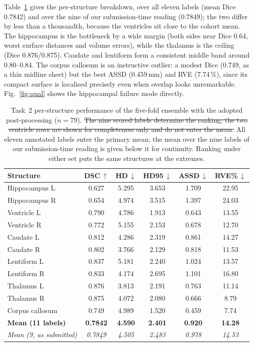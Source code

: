 \documentclass[runningheads]{llncs}
\newcommand{\addone}[1]{\textcolor{revone}{#1}}
\newcommand{\delone}[1]{\textcolor{revone}{\sout{#1}}}
\newcommand{\rowsone}{\color{revone}}
\begin{document}
Table~\ref{tab:perstruct} gives the per-structure breakdown\addone{, over
all eleven labels (mean Dice 0.7842) and over the nine of our submission-time reading
(0.7849); the two differ by less than a thousandth, because the ventricles sit close
to the cohort mean}. The hippocampus is
the bottleneck by a wide margin (both sides near Dice 0.64, worst surface
distances and volume errors), while the thalamus is the ceiling (Dice
0.876/0.875). Caudate and lentiform form a consistent middle band around
0.80--0.84. The corpus callosum is an instructive outlier: a modest Dice (0.749,
as a thin midline sheet) but the best ASSD (0.459\,mm) and RVE (7.74\,\%), since
its compact surface is localised precisely even when overlap looks unremarkable.
Fig.~\ref{fig:qual} shows the hippocampal failure mode directly.

\begin{table}[htbp]
\caption{Task~2 per-structure performance of the five-fold ensemble with the
adopted post-processing ($n=79$). \delone{The nine scored labels determine the ranking;
the two ventricle rows are shown for completeness only and do not enter the mean.}
\addone{All eleven annotated labels enter the primary mean; the mean over the nine
labels of our submission-time reading is given below it for continuity. Ranking under
either set puts the same structures at the extremes.}}
\label{tab:perstruct}
\centering
\setlength{\tabcolsep}{5pt}
\rowsone
\begin{tabular}{lccccc}
\toprule
Structure & DSC\,$\uparrow$ & HD\,$\downarrow$ & HD95\,$\downarrow$ &
ASSD\,$\downarrow$ & RVE\%\,$\downarrow$ \\
\midrule
Hippocampus L & 0.627 & 5.295 & 3.653 & 1.709 & 22.95 \\
Hippocampus R & 0.654 & 4.974 & 3.515 & 1.397 & 24.03 \\
Ventricle L   & 0.790 & 4.786 & 1.913 & 0.643 & 13.55 \\
Ventricle R   & 0.772 & 5.155 & 2.153 & 0.678 & 12.70 \\
Caudate L     & 0.812 & 4.286 & 2.319 & 0.861 & 14.27 \\
Caudate R     & 0.802 & 3.766 & 2.129 & 0.818 & 11.53 \\
Lentiform L   & 0.837 & 5.181 & 2.240 & 1.024 & 13.57 \\
Lentiform R   & 0.833 & 4.174 & 2.695 & 1.101 & 16.80 \\
Thalamus L    & 0.876 & 3.813 & 2.191 & 0.763 & 11.14 \\
Thalamus R    & 0.875 & 4.072 & 2.080 & 0.666 & \phantom{0}8.79 \\
Corpus callosum & 0.749 & 4.989 & 1.520 & 0.459 & \phantom{0}7.74 \\
\midrule
\textbf{Mean (11 labels)} & \textbf{0.7842} & \textbf{4.590} & \textbf{2.401} &
  \textbf{0.920} & \textbf{14.28} \\
\textit{Mean (9, as submitted)} & \textit{0.7849} & \textit{4.505} & \textit{2.483} &
  \textit{0.978} & \textit{14.53} \\
\bottomrule
\end{tabular}
\end{table}
\end{document}
